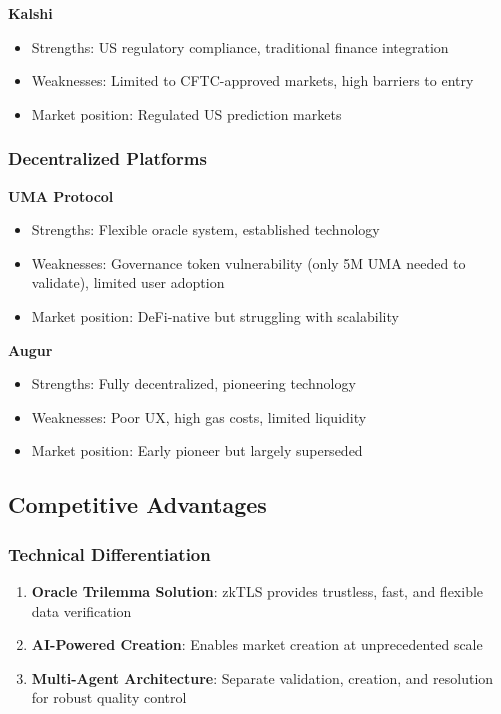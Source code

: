 \documentclass[11pt,a4paper]{article}
\begin{document}
\textbf{Kalshi}
\begin{itemize}
    \item Strengths: US regulatory compliance, traditional finance integration
    \item Weaknesses: Limited to CFTC-approved markets, high barriers to entry
    \item Market position: Regulated US prediction markets
\end{itemize}

\subsubsection{Decentralized Platforms}
\textbf{UMA Protocol}
\begin{itemize}
    \item Strengths: Flexible oracle system, established technology
    \item Weaknesses: Governance token vulnerability (only 5M UMA needed to validate), limited user adoption
    \item Market position: DeFi-native but struggling with scalability
\end{itemize}

\textbf{Augur}
\begin{itemize}
    \item Strengths: Fully decentralized, pioneering technology
    \item Weaknesses: Poor UX, high gas costs, limited liquidity
    \item Market position: Early pioneer but largely superseded
\end{itemize}

\subsection{Competitive Advantages}

\subsubsection{Technical Differentiation}
\begin{enumerate}
    \item \textbf{Oracle Trilemma Solution}: zkTLS provides trustless, fast, and flexible data verification
    \item \textbf{AI-Powered Creation}: Enables market creation at unprecedented scale
    \item \textbf{Multi-Agent Architecture}: Separate validation, creation, and resolution for robust quality control
\end{enumerate}
\end{document}
